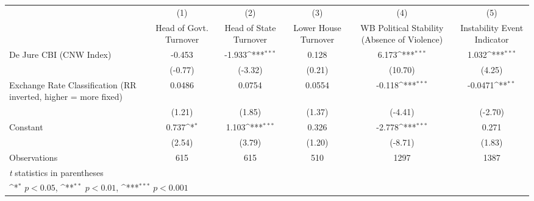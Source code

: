 {
\def\sym#1{\ifmmode^{#1}\else\(^{#1}\)\fi}
\begin{tabular*}{\linewidth}{@{\hskip\tabcolsep\extracolsep\fill}l*{5}{c}}
\hline\hline
                &\multicolumn{1}{c}{(1)}&\multicolumn{1}{c}{(2)}&\multicolumn{1}{c}{(3)}&\multicolumn{1}{c}{(4)}&\multicolumn{1}{c}{(5)}\\
                &\multicolumn{1}{c}{Head of Govt. Turnover}&\multicolumn{1}{c}{Head of State Turnover}&\multicolumn{1}{c}{Lower House Turnover}&\multicolumn{1}{c}{WB Political Stability (Absence of Violence)}&\multicolumn{1}{c}{Instability Event Indicator}\\
\hline
De Jure CBI (CNW Index)&   -0.453         &   -1.933\sym{***}&    0.128         &    6.173\sym{***}&    1.032\sym{***}\\
                &  (-0.77)         &  (-3.32)         &   (0.21)         &  (10.70)         &   (4.25)         \\
[1em]
Exchange Rate Classification (RR inverted, higher = more fixed)&   0.0486         &   0.0754         &   0.0554         &   -0.118\sym{***}&  -0.0471\sym{**} \\
                &   (1.21)         &   (1.85)         &   (1.37)         &  (-4.41)         &  (-2.70)         \\
[1em]
Constant        &    0.737\sym{*}  &    1.103\sym{***}&    0.326         &   -2.778\sym{***}&    0.271         \\
                &   (2.54)         &   (3.79)         &   (1.20)         &  (-8.71)         &   (1.83)         \\
\hline
Observations    &      615         &      615         &      510         &     1297         &     1387         \\
\hline\hline
\multicolumn{6}{l}{\footnotesize \textit{t} statistics in parentheses}\\
\multicolumn{6}{l}{\footnotesize \sym{*} \(p<0.05\), \sym{**} \(p<0.01\), \sym{***} \(p<0.001\)}\\
\end{tabular*}
}
